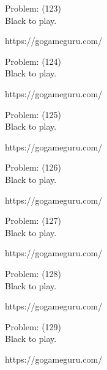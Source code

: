 \documentclass[11pt]{article}
\begin{document}
\begin{minipage}[t]{0.5\textwidth}
  {\centering
  
  Problem: (123)\\
  Black to play.

https://gogameguru.com/\\
  }
\end{minipage}
\begin{minipage}[t]{0.5\textwidth}
  {\centering
  
  Problem: (124)\\
  Black to play.

https://gogameguru.com/\\
  }
\end{minipage}
\begin{minipage}[t]{0.5\textwidth}
  {\centering
  
  Problem: (125)\\
  Black to play.

https://gogameguru.com/\\
  }
\end{minipage}
\begin{minipage}[t]{0.5\textwidth}
  {\centering
  
  Problem: (126)\\
  Black to play.

https://gogameguru.com/\\
  }
\end{minipage}
\begin{minipage}[t]{0.5\textwidth}
  {\centering
  
  Problem: (127)\\
  Black to play.

https://gogameguru.com/\\
  }
\end{minipage}
\begin{minipage}[t]{0.5\textwidth}
  {\centering
  
  Problem: (128)\\
  Black to play.

https://gogameguru.com/\\
  }
\end{minipage}
\begin{minipage}[t]{0.5\textwidth}
  {\centering
  
  Problem: (129)\\
  Black to play.

https://gogameguru.com/\\
  }
\end{minipage}
\end{document}
